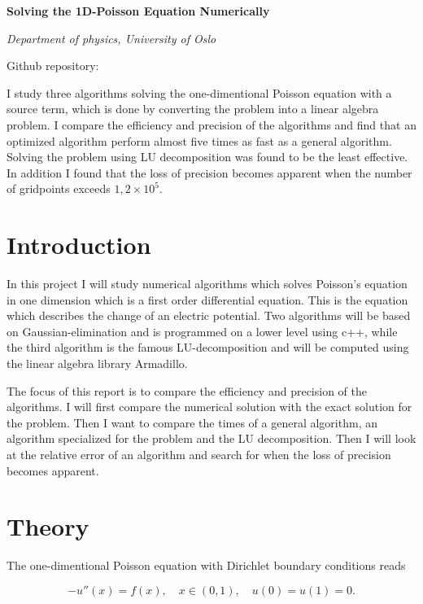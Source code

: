 \documentclass[12pt]{article}
\renewenvironment{abstract}
{\small
 \begin{center}
 \bfseries \abstractname\vspace{-.5em}\vspace{0pt}
 \end{center}
 \list{}{
   \setlength{\leftmargin}{2cm}%
   \setlength{\rightmargin}{\leftmargin}%
 }%
 \item\relax}
{\endlist}
\begin{document}
\begin{center}
  \Large \textbf{Solving the 1D-Poisson Equation Numerically}

  \large{}
  
  \textit{Department of physics, University of Oslo}



  Github repository: \cite{kristian}
\end{center}
\begin{abstract}
  I study three algorithms solving the one-dimentional Poisson equation with a source term, which is done by converting the problem into a linear algebra problem. I compare the efficiency and precision of the algorithms and find that an optimized algorithm perform almost five times as fast as a general algorithm. Solving the problem using LU decomposition was found to be the least effective. In addition I found that the loss of precision becomes apparent when the number of gridpoints exceeds $1,2\times 10^5$.


\end{abstract}
\section{Introduction}
In this project I will study numerical algorithms which solves Poisson's equation in one dimension which is a first order differential equation. This is the equation which describes the change of an electric potential. Two algorithms will be based on Gaussian-elimination and is programmed on a lower level using c++, while the third algorithm is the famous LU-decomposition and will be computed using the linear algebra library Armadillo.

The focus of this report is to compare the efficiency and precision of the algorithms. I will first compare the numerical solution with the exact solution for the problem. Then I want to compare the times of a general algorithm, an algorithm specialized for the problem and the LU decomposition. Then I will look at the relative error of an algorithm and search for when the loss of precision becomes apparent.

\section{Theory}
The one-dimentional Poisson equation 
with Dirichlet boundary conditions reads 

\begin{equation*}
 -u''(x)=f(x),\quad x\in (0,1),\quad u(0)=u(1)=0.
\end{equation*}
\end{document}
